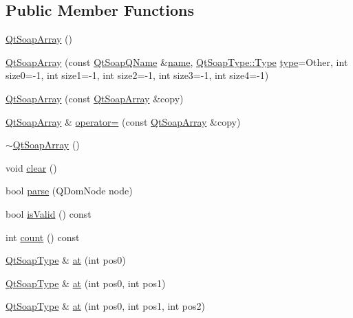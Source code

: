\subsection*{Public Member Functions}
\begin{DoxyCompactItemize}
\item 
\mbox{\hyperlink{class_qt_soap_array_acae4791726c00ea165d0a2e0d91ef6e8}{Qt\+Soap\+Array}} ()
\item 
\mbox{\hyperlink{class_qt_soap_array_a4f29a3025733877fa2c04f8d705c2a8b}{Qt\+Soap\+Array}} (const \mbox{\hyperlink{class_qt_soap_q_name}{Qt\+Soap\+Q\+Name}} \&\mbox{\hyperlink{class_qt_soap_type_a6d5fb3d1ea4cf6d1432c7f62a5da09c3}{name}}, \mbox{\hyperlink{class_qt_soap_type_a840b69f1d92eeb4e64ae1e0439d54683}{Qt\+Soap\+Type\+::\+Type}} \mbox{\hyperlink{class_qt_soap_type_acd4282b8a4b6a709c3504cc976335fba}{type}}=Other, int size0=-\/1, int size1=-\/1, int size2=-\/1, int size3=-\/1, int size4=-\/1)
\item 
\mbox{\hyperlink{class_qt_soap_array_a8d501105f8ef84967d6833acd021cc37}{Qt\+Soap\+Array}} (const \mbox{\hyperlink{class_qt_soap_array}{Qt\+Soap\+Array}} \&copy)
\item 
\mbox{\hyperlink{class_qt_soap_array}{Qt\+Soap\+Array}} \& \mbox{\hyperlink{class_qt_soap_array_af9e4c68154b3e3a2a60ec2b5c57643bc}{operator=}} (const \mbox{\hyperlink{class_qt_soap_array}{Qt\+Soap\+Array}} \&copy)
\item 
\mbox{\hyperlink{class_qt_soap_array_a545ceca740be6850e510e4c9b98e4591}{$\sim$\+Qt\+Soap\+Array}} ()
\item 
void \mbox{\hyperlink{class_qt_soap_array_a51440ed0ef64c0048bbc46dc5fbe4003}{clear}} ()
\item 
bool \mbox{\hyperlink{class_qt_soap_array_a203a7b3fbe4a98c6cd997fe0fcebb4c3}{parse}} (Q\+Dom\+Node node)
\item 
bool \mbox{\hyperlink{class_qt_soap_array_ac74c2b02dd640d9a39dc963753aa10a2}{is\+Valid}} () const
\item 
int \mbox{\hyperlink{class_qt_soap_array_a5cf3ee6dc1faf7198be24fcfdf0e3bb8}{count}} () const
\item 
\mbox{\hyperlink{class_qt_soap_type}{Qt\+Soap\+Type}} \& \mbox{\hyperlink{class_qt_soap_array_a97d6e3695d7cd56dc60c52a492f653a9}{at}} (int pos0)
\item 
\mbox{\hyperlink{class_qt_soap_type}{Qt\+Soap\+Type}} \& \mbox{\hyperlink{class_qt_soap_array_afe1b9a7dc3ebb29e544306af5667e5fa}{at}} (int pos0, int pos1)
\item 
\mbox{\hyperlink{class_qt_soap_type}{Qt\+Soap\+Type}} \& \mbox{\hyperlink{class_qt_soap_array_a773a47f952fd917c581740874f6e8c01}{at}} (int pos0, int pos1, int pos2)

\end{DoxyCompactItemize}
